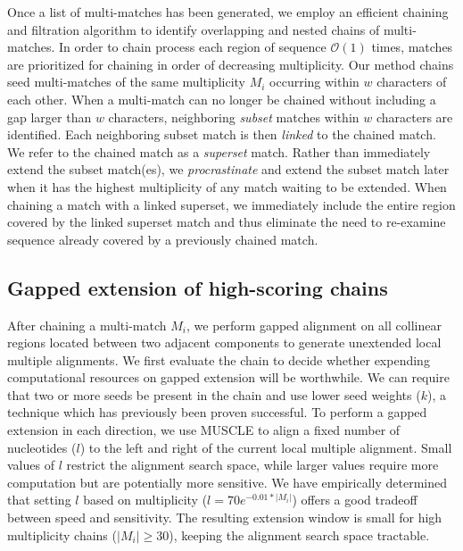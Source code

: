 \documentclass{llncs}
\begin{document}
Once a list of multi-matches has been generated, we employ an
efficient chaining and filtration algorithm to identify overlapping
and nested chains of multi-matches\cite{ref-procrast}. In order to
chain process each region of sequence $\mathcal{O}(1)$ times, matches
are prioritized for chaining in order of decreasing multiplicity.  Our
method chains seed multi-matches of the same multiplicity $M_{i}$
occurring within $w$ characters of each other.  When a multi-match can
no longer be chained without including a gap larger than $w$
characters, neighboring \textit{subset} matches within $w$ characters
are identified. Each neighboring subset match is then \textit{linked}
to the chained match. We refer to the chained match as a
\textit{superset} match. Rather than immediately extend the subset
match(es), we \textit{procrastinate} and extend the subset match later
when it has the highest multiplicity of any match waiting to be
extended. When chaining a match with a linked superset, we immediately
include the entire region covered by the linked superset match and
thus eliminate the need to re-examine sequence already covered by a
previously chained match.

\subsection{Gapped extension of high-scoring chains}
After chaining a multi-match $M_i$, we perform gapped alignment on all
collinear regions located between two adjacent components to generate
unextended local multiple alignments. We first evaluate the chain to
decide whether expending computational resources on gapped extension
will be worthwhile. We can require that two or more seeds be present
in the chain and use lower seed weights ($k$), a technique which has
previously been proven
successful\cite{ref-blastz,ref-gappedblast,ref-blat}.  To perform a
gapped extension in each direction, we use MUSCLE to align a fixed
number of nucleotides ($l$) to the left and right of the current local
multiple alignment.  Small values of $l$ restrict the alignment search
space, while larger values require more computation but are
potentially more sensitive.  We have empirically determined that
setting $l$ based on multiplicity ($l = 70e^{-0.01*|M_{i}|}$) offers a
good tradeoff between speed and sensitivity.  The resulting extension
window is small for high multiplicity chains ($|M_{i}|\geq 30$),
keeping the alignment search space tractable.
\end{document}
